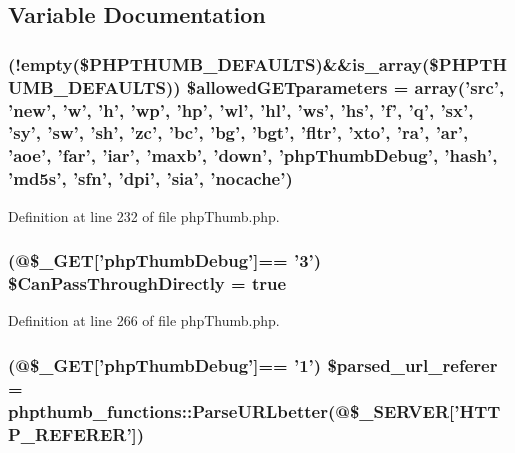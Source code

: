 \subsection{\-Variable \-Documentation}
\hypertarget{php_thumb_8php_ae43c190c11f16793628da099e45ed3ee}{
\subsubsection[{\$allowed\-G\-E\-Tparameters}]{ (!empty(\$\-P\-H\-P\-T\-H\-U\-M\-B\-\_\-\-D\-E\-F\-A\-U\-L\-T\-S)\&\&is\-\_\-array(\$\-P\-H\-P\-T\-H\-U\-M\-B\-\_\-\-D\-E\-F\-A\-U\-L\-T\-S)) \$allowed\-G\-E\-Tparameters = array('src', 'new', 'w', 'h', 'wp', 'hp', 'wl', 'hl', 'ws', 'hs', 'f', 'q', 'sx', 'sy', 'sw', 'sh', 'zc', 'bc', 'bg', 'bgt', 'fltr', 'xto', 'ra', 'ar', 'aoe', 'far', 'iar', 'maxb', 'down', 'php\-Thumb\-Debug', 'hash', 'md5s', 'sfn', 'dpi', 'sia', 'nocache')}}\label{php_thumb_8php_ae43c190c11f16793628da099e45ed3ee}


\-Definition at line 232 of file php\-Thumb.\-php.

\hypertarget{php_thumb_8php_a5b2c559ec858186c5929b449bef74811}{
\subsubsection[{\$\-Can\-Pass\-Through\-Directly}]{ (@\$\-\_\-\-G\-E\-T\mbox{[}'php\-Thumb\-Debug'\mbox{]}== '3') \$\-Can\-Pass\-Through\-Directly = true}}\label{php_thumb_8php_a5b2c559ec858186c5929b449bef74811}


\-Definition at line 266 of file php\-Thumb.\-php.

\hypertarget{php_thumb_8php_ac4860cc4cf36c1934eaa5362310af460}{
\subsubsection[{\$parsed\-\_\-url\-\_\-referer}]{ (@\$\-\_\-\-G\-E\-T\mbox{[}'php\-Thumb\-Debug'\mbox{]}== '1') \$parsed\-\_\-url\-\_\-referer = {\bf phpthumb\-\_\-functions\-::\-Parse\-U\-R\-Lbetter}(@\$\-\_\-\-S\-E\-R\-V\-E\-R\mbox{[}'\-H\-T\-T\-P\-\_\-\-R\-E\-F\-E\-R\-E\-R'\mbox{]})}}\label{php_thumb_8php_ac4860cc4cf36c1934eaa5362310af460}


